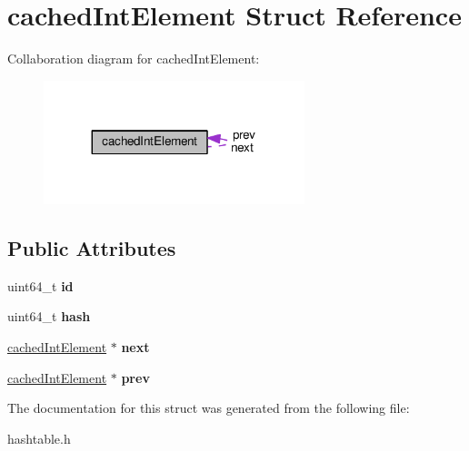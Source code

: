 \hypertarget{structcachedIntElement}{}\section{cached\+Int\+Element Struct Reference}
\label{structcachedIntElement}


Collaboration diagram for cached\+Int\+Element\+:
\nopagebreak
\begin{figure}[H]
\begin{center}
\leavevmode
\includegraphics[width=215pt]{structcachedIntElement__coll__graph}
\end{center}
\end{figure}
\subsection*{Public Attributes}
\begin{DoxyCompactItemize}
\item 
uint64\+\_\+t {\bfseries id}\hypertarget{structcachedIntElement_acda821458cfe34dda3bff8b7b0373fb9}{}\label{structcachedIntElement_acda821458cfe34dda3bff8b7b0373fb9}

\item 
uint64\+\_\+t {\bfseries hash}\hypertarget{structcachedIntElement_a20d62592d37c7e8c91449f534431aeb9}{}\label{structcachedIntElement_a20d62592d37c7e8c91449f534431aeb9}

\item 
\hyperlink{structcachedIntElement}{cached\+Int\+Element} $\ast$ {\bfseries next}\hypertarget{structcachedIntElement_ae64f5fae8aa27243af30ef13cb3ebce6}{}\label{structcachedIntElement_ae64f5fae8aa27243af30ef13cb3ebce6}

\item 
\hyperlink{structcachedIntElement}{cached\+Int\+Element} $\ast$ {\bfseries prev}\hypertarget{structcachedIntElement_a90b30c8883b80e42fbf59fbc1bc8727a}{}\label{structcachedIntElement_a90b30c8883b80e42fbf59fbc1bc8727a}

\end{DoxyCompactItemize}


The documentation for this struct was generated from the following file\+:\begin{DoxyCompactItemize}
\item 
hashtable.\+h\end{DoxyCompactItemize}
